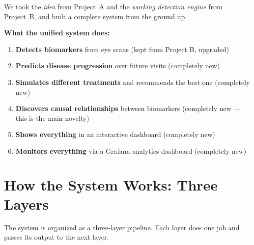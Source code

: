 \documentclass[12pt,a4paper]{article}
\begin{document}
We took the \emph{idea} from Project~A and the \emph{working detection engine} from Project~B, and built a complete system from the ground up.

\begin{mdframed}[style=afterbox]
\textbf{What the unified system does:}
\begin{enumerate}[nosep]
  \item \textbf{Detects biomarkers} from eye scans (kept from Project B, upgraded)
  \item \textbf{Predicts disease progression} over future visits (completely new)
  \item \textbf{Simulates different treatments} and recommends the best one (completely new)
  \item \textbf{Discovers causal relationships} between biomarkers (completely new --- this is the main novelty)
  \item \textbf{Shows everything} in an interactive dashboard (completely new)
  \item \textbf{Monitors everything} via a Grafana analytics dashboard (completely new)
\end{enumerate}
\end{mdframed}


\section{How the System Works: Three Layers}

The system is organized as a three-layer pipeline. Each layer does one job and passes its output to the next layer.
\end{document}
